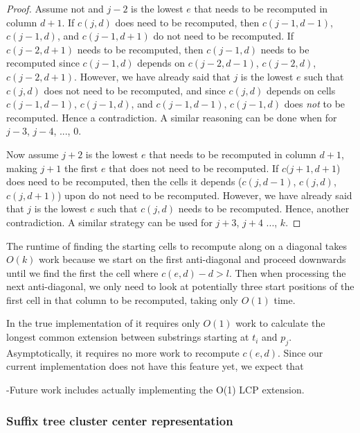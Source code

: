 \begin{proof}
Assume not and $j-2$ is the lowest $e$ that needs to be recomputed in column $d+1$.  If $c(j,d)$ does need to be recomputed, then $c(j-1,d-1)$, $c(j-1,d)$, and $c(j-1,d+1)$ do not need to be recomputed.  If $c(j-2,d+1)$ needs to be recomputed, then $c(j-1,d)$ needs to be recomputed since $c(j-1,d)$ depends on $c(j-2,d-1)$, $c(j-2,d)$, $c(j-2,d+1)$.  However, we have already said that $j$ is the lowest $e$ such that $c(j,d)$ does not need to be recomputed, and since $c(j,d)$ depends on cells $c(j-1,d-1)$, $c(j-1,d)$, and $c(j-1,d-1)$, $c(j-1,d)$ does \emph{not} to be recomputed.  Hence a contradiction.  A similar reasoning can be done when for $j-3$, $j-4$, ..., 0.

Now assume $j+2$ is the lowest $e$ that needs to be recomputed in column $d+1$, making $j+1$ the first $e$ that does not need to be recomputed.  If $c(j+1,d+1$) does need to be recomputed, then the cells it depends ($c(j,d-1)$, $c(j,d)$, $c(j,d+1)$) upon do not need to be recomputed.  However, we have already said that $j$ is the lowest $e$ such that $c(j,d)$ needs to be recomputed.  Hence, another contradiction.  A similar strategy can be used for $j+3$, $j+4$ ..., $k$.


\end{proof}

The runtime of finding the starting cells to recompute along on a diagonal takes $O(k)$ work because we start on the first anti-diagonal and proceed downwards until we find the first the cell where $c(e,d) - d > l$.
Then when processing the next anti-diagonal, we only need to look at potentially three start positions of the first cell in that column to be recomputed, taking only $O(1)$ time.

In the true implementation of it requires only $O(1)$ work to calculate the longest common extension between substrings starting at $t_i$ and $p_j$.
Asymptotically, it requires no more work to recompute $c(e,d)$.
Since our current implementation does not have this feature yet, we expect that

-Future work includes actually implementing the O(1) LCP extension.

\subsubsection{Suffix tree cluster center representation}

